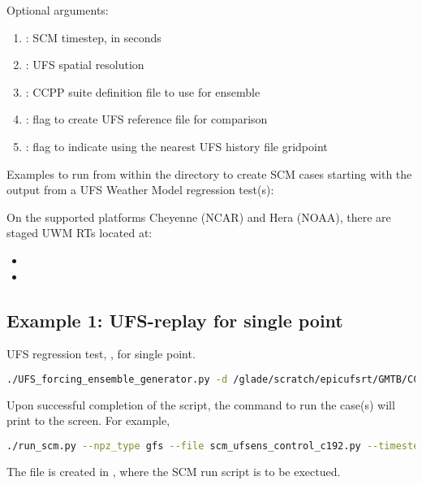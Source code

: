 Optional arguments:
\begin{enumerate}
\item {}: SCM timestep, in seconds
\item {}: UFS spatial resolution
\item {}: CCPP suite definition file to use for ensemble
\item {}: flag to create UFS reference file for comparison
\item {}: flag to indicate using the nearest UFS history file gridpoint
\end{enumerate}

Examples to run from within the  directory to create SCM cases starting with the output from a UFS Weather Model regression test(s):

On the supported platforms Cheyenne (NCAR) and Hera (NOAA), there are staged UWM RTs located at:
\begin{itemize}
\item {}
\item {}
\end{itemize}

\subsection{Example 1: UFS-replay for single point}
\label{subsection: example1}

UFS regression test, , for single point.
\begin{lstlisting}[language=bash]
./UFS_forcing_ensemble_generator.py -d /glade/scratch/epicufsrt/GMTB/CCPP-SCM/UFS_RTs/control_c192/ -sc --C_RES 192 -dt 360  -n control_c192 -lons 300 -lats 34
\end{lstlisting}

Upon successful completion of the script, the command to run the case(s) will print to the screen. For example,

\begin{lstlisting}[language=bash]
./run_scm.py --npz_type gfs --file scm_ufsens_control_c192.py --timestep 360
\end{lstlisting}

The file  is created in , where the SCM run script is to be exectued.

